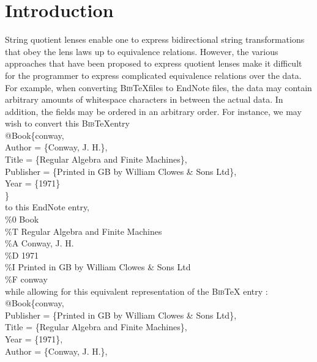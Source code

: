 \documentclass{svproc}
\begin{document}
\section{Introduction}
String quotient lenses enable one to express bidirectional string
transformations that obey the lens laws up to equivalence relations. However,
the various approaches that have been proposed to express quotient lenses
make it difficult for the programmer to express complicated equivalence
relations over the data.\\
For example, when converting \textsc{Bib}\TeX files to EndNote files, the data
may contain arbitrary amounts of whitespace characters in between the actual
data. In addition, the fields may be ordered in an arbitrary order. For
instance, we may wish to convert this \textsc{Bib}\TeX entry 
\\
\newline
@Book\{conway,\\ 
  Author = \{Conway, J. H.\},\\
  Title = \{Regular Algebra and Finite Machines\},\\
  Publisher = \{Printed in GB by William Clowes \& Sons Ltd\},\\
  Year = \{1971\}\\
\}\\
\newline
to this EndNote entry,\\
\newline
\%0 Book\\
\%T Regular Algebra and Finite Machines\\
\%A Conway, J. H.\\
\%D 1971\\
\%I Printed in GB by William Clowes \& Sons Ltd\\
\%F conway\\
\newline
while allowing for this equivalent representation of the \textsc{Bib}\TeX
\; entry :\\
\newline
@Book\{conway,\\ 
    Publisher = \{Printed in GB by William Clowes \& Sons Ltd\},\\
    \hspace*{10mm} Title = \{Regular Algebra and Finite Machines\},\\
    \newline
    Year = \{1971\},\\
    \hspace*{20mm} Author = \{Conway, J. H.\},\\
\end{document}
